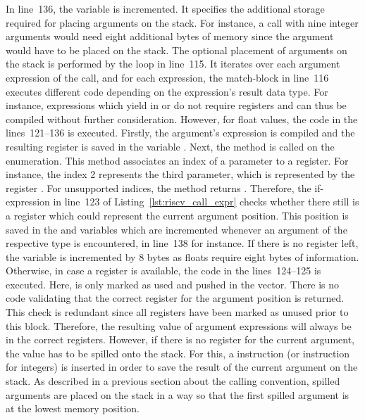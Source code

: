 In line~136, the  variable is incremented.
It specifies the additional storage required for placing arguments on the stack.
For instance, a call with nine integer arguments would need eight additional bytes of memory since the  argument would have to be placed on the stack.
The optional placement of arguments on the stack is performed by the loop in line~115.
It iterates over each argument expression of the call, and for each expression, the match-block in line~116 executes different code depending on the expression's result data type.
For instance, expressions which yield in \qVerb{()} or \qVerb{!} do not require registers and can thus be compiled without further consideration.
However, for float values, the code in the lines~121--136 is executed.
Firstly, the argument's expression is compiled and the resulting register is saved in the variable .
Next, the  method is called on the  enumeration.
This method associates an index of a parameter to a register.
For instance, the index 2 represents the third parameter, which is represented by the register .
For unsupported indices, the method returns .
Therefore, the if-expression in line~123 of Listing~\ref{lst:riscv_call_expr} checks whether there still is a register which could represent the current argument position.
This position is saved in the  and  variables which are incremented whenever an argument of the respective type is encountered, in line~138 for instance.
If there is no register left, the  variable is incremented by 8 bytes as floats require eight bytes of information.
Otherwise, in case a register is available, the code in the lines~124--125 is executed.
Here,  is only marked as used and pushed in the  vector.
There is no code validating that the correct register for the argument position is returned.
This check is redundant since all registers have been marked as unused prior to this block.
Therefore, the resulting value of argument expressions will always be in the correct registers.
However, if there is no register for the current argument, the value has to be spilled onto the stack.
For this, a  instruction (or  instruction for integers) is inserted in order to save the result of the current argument on the stack.
As described in a previous section about the \riscv{} calling convention, spilled arguments are placed on the stack in a way so that the first spilled argument is at the lowest memory position.

